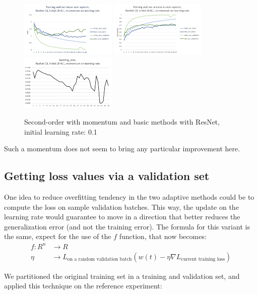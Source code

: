 \documentclass{article}
\begin{document}
  \begin{figure}[!h]
  	\includegraphics[width=130pt]{loss_resnet_mom_lr_0_1.png}
  	\includegraphics[width=130pt]{acc_resnet_mom_lr_0_1.png}
  	\includegraphics[width=130pt]{lr_resnet_mom_lr_0_1.png}
  	\caption{Second-order with momentum and basic methods with ResNet, initial learning rate: 0.1}
  \end{figure}

  Such a momentum does not seem to bring any particular improvement here. 
  
  \subsection{Getting loss values via a validation set}
  
  One idea to reduce overfitting tendency in the two adaptive methods could be to compute the loss on sample validation batches. This way, the update on the learning rate would guarantee to move in a direction that better reduces the generalization error (and not the training error). The formula for this variant is the same, expect for the use of the $f$ function, that now becomes:\\
  \begin{align}
  f : R^{n} &\rightarrow R\\
  \eta &\rightarrow L_{\text{on a random validation batch}}(w(t)-\eta \nabla L_{\text{current training loss}})
  \end{align}
  
  We partitioned the original training set in a training and validation set, and applied this technique on the reference experiment:\\
  
\end{document}
